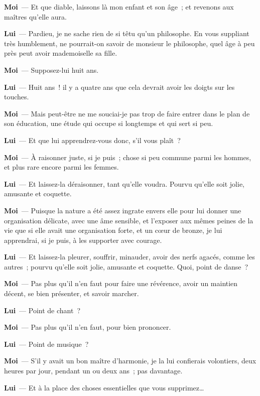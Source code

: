 \documentclass[french,twoside]{book} %
\newcommand{\labelchar}[1]{\textbf{\color{rubric} #1}}
\begin{document}
\labelchar{Moi} — Et que diable, laissons là mon enfant et son âge ; et revenons aux maîtres qu’elle aura.\par
\labelchar{Lui} — Pardieu, je ne sache rien de si têtu qu’un philosophe. En vous suppliant très humblement, ne pourrait-on savoir de monsieur le philosophe, quel âge à peu près peut avoir mademoiselle sa fille.\par
\labelchar{Moi} — Supposez-lui huit ans.\par
\labelchar{Lui} — Huit ans ! il y a quatre ans que cela devrait avoir les doigts sur les touches.\par
\labelchar{Moi} — Mais peut-être ne me souciai-je pas trop de faire entrer dans le plan de son éducation, une étude qui occupe si longtemps et qui sert si peu.\par
\labelchar{Lui} — Et que lui apprendrez-vous donc, s’il vous plaît ?\par
\labelchar{Moi} — À raisonner juste, si je puis ; chose si peu commune parmi les hommes, et plus rare encore parmi les femmes.\par
\labelchar{Lui} — Et laissez-la déraisonner, tant qu’elle voudra. Pourvu qu’elle soit jolie, amusante et coquette.\par
\labelchar{Moi} — Puisque la nature a été assez ingrate envers elle pour lui donner une organisation délicate, avec une âme sensible, et l’exposer aux mêmes peines de la vie que si elle avait une organisation forte, et un cœur de bronze, je lui apprendrai, si je puis, à les supporter avec courage.\par
\labelchar{Lui} — Et laissez-la pleurer, souffrir, minauder, avoir des nerfs agacés, comme les autres ; pourvu qu’elle soit jolie, amusante et coquette. Quoi, point de danse ?\par
\labelchar{Moi} — Pas plus qu’il n’en faut pour faire une révérence, avoir un maintien décent, se bien présenter, et savoir marcher.\par
\labelchar{Lui} — Point de chant ?\par
\labelchar{Moi} — Pas plus qu’il n’en faut, pour bien prononcer.\par
\labelchar{Lui} — Point de musique ?\par
\labelchar{Moi} — S’il y avait un bon maître d’harmonie, je la lui confierais volontiers, deux heures par jour, pendant un ou deux ans ; pas davantage.\par
\labelchar{Lui} — Et à la place des choses essentielles que vous supprimez…\par
\end{document}
